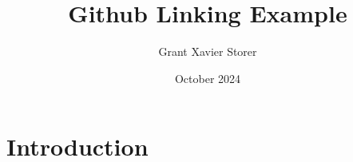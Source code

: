 \documentclass{article}
\title{Github Linking Example}
\author{Grant Xavier Storer}
\date{October 2024}
\begin{document}
\maketitle

\section{Introduction}
\end{document}
